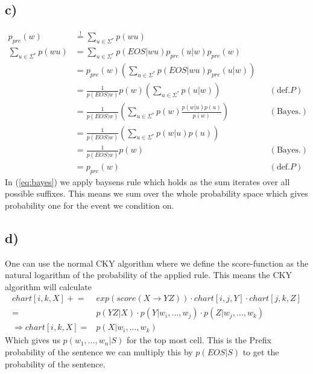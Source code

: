 \documentclass[a4paper,12pt]{ETHexercise}
\begin{document}
\subsection*{c)}
\begin{align}
    p_{pre}(w) &\stackrel{!}{=} \sum_{u\in\Sigma^*}p(wu)\\
    \sum_{u\in\Sigma^*}p(wu) &= \sum_{u \in \Sigma^*}p(EOS|wu)p_{pre}(u|w)p_{pre}(w)\\
    &= p_{pre}(w) \left(\sum_{u \in \Sigma^*}p(EOS|wu)p_{pre}(u|w)\right)\\
    &= \frac{1}{p(EOS|w)} p(w) \left(\sum_{u \in \Sigma^*}p(u|w)\right) &&(\text{def.} P)\\
    &= \frac{1}{p(EOS|w)} \left(\sum_{u \in \Sigma^*}p(w)\frac{p(w|u)p(u)}{p(w)}\right) &&(\text{Bayes.}) \label{eq:bayes}\\
    &= \frac{1}{p(EOS|w)} \left(\sum_{u \in \Sigma^*}p(w|u)p(u)\right) \\
    &= \frac{1}{p(EOS|w)} p(w) &&(\text{Bayes.})\\
    &= p_{pre}(w) &&(\text{def.} P)
\end{align}
In (\ref{eq:bayes}) we apply baysens rule which holds as the sum iterates over all possible suffixes. This means we sum over the whole probability space which gives probability one for the event we condition on.

\subsection*{d)}
One can use the normal CKY algorithm where we define the score-function as the natural logarithm of the probability of the applied rule.
This means the CKY algorithm will calculate
\begin{align}
   chart[i,k,X] \mathrel{+}= &exp(score(X\rightarrow Y Z)) \cdot chart[i,j,Y] \cdot chart[j,k,Z] \\
    = &p( Y Z| X) \cdot p(Y|w_i,...,w_j) \cdot p(Z|w_j,...,w_k)\\
    \Rightarrow chart[i,k,X] = &p(X|w_i,...,w_k)
\end{align}
Which gives us $p(w_1,...,w_n|S)$ for the top most cell. This is the Prefix probability of the sentence we can multiply this by $p(EOS|S)$ to get the probability of the sentence.
\end{document}
